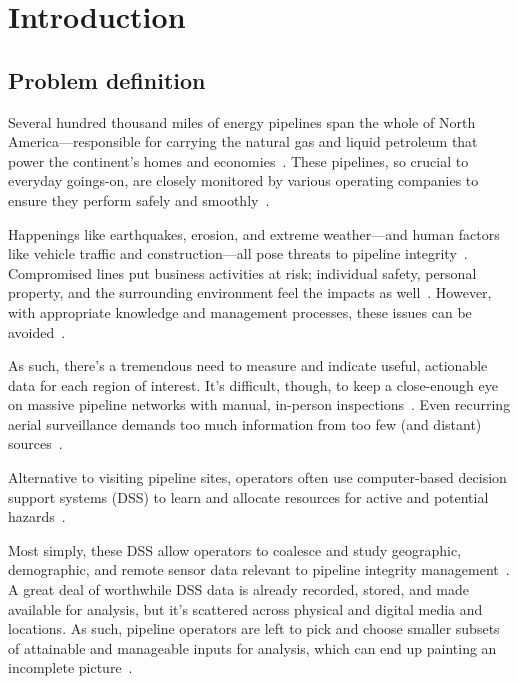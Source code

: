 \chapter{Introduction}
\label{intro}

\section{Problem definition}
\label{Problem}
Several hundred thousand miles of energy pipelines span the whole of North America---responsible for carrying the natural gas and liquid petroleum that power the continent's homes and economies~\cite{PHMSA}. These pipelines, so crucial to everyday goings-on, are closely monitored by various operating companies to ensure they perform safely and smoothly~\cite{PHMSA2013}.

Happenings like earthquakes, erosion, and extreme weather---and human factors like vehicle traffic and construction---all pose threats to pipeline integrity~\cite{MichaelBakerJr.2008,Chastain,Dunning2013}. Compromised lines put business activities at risk; individual safety, personal property, and the surrounding environment feel the impacts as well~\cite{Dunning2013}. However, with appropriate knowledge and management processes, these issues can be avoided~\cite{Dunning2013,Chastain}.

As such, there's a tremendous need to measure and indicate useful, actionable data for each region of interest. It's difficult, though, to keep a close-enough eye on massive pipeline networks with manual, in-person inspections~\cite{Dunning2013,Chastain}. Even recurring aerial surveillance demands too much information from too few (and distant) sources~\cite{Dunning2013}.

Alternative to visiting pipeline sites, operators often use computer-based decision support systems (DSS) to learn and allocate resources for active and potential hazards~\cite{PHMSA2013,Dunning2013}. 

Most simply, these DSS allow operators to coalesce and study geographic, demographic, and remote sensor data relevant to pipeline integrity management~\cite{RedlandsSDSS,Dunning2013}. A great deal of worthwhile DSS data is already recorded, stored, and made available for analysis, but it's scattered across physical and digital media and locations. As such, pipeline operators are left to pick and choose smaller subsets of attainable and manageable inputs for analysis, which can end up painting an incomplete picture~\cite{Dunning2013}.

